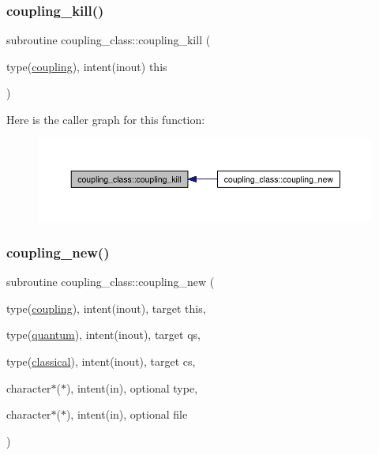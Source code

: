 \mbox{\label{namespacecoupling__class_a774339d5b87453601c0664a199df7823}} 
\subsubsection{\texorpdfstring{coupling\+\_\+kill()}{coupling\_kill()}}
{\footnotesize\ttfamily subroutine coupling\+\_\+class\+::coupling\+\_\+kill (\begin{DoxyParamCaption}\item[{type(\hyperlink{structcoupling__class_1_1coupling}{coupling}), intent(inout)}]{this }\end{DoxyParamCaption})\hspace{0.3cm}{\ttfamily [private]}}

Here is the caller graph for this function\+:\nopagebreak
\begin{figure}[H]
\begin{center}
\leavevmode
\includegraphics[width=350pt]{namespacecoupling__class_a774339d5b87453601c0664a199df7823_icgraph}
\end{center}
\end{figure}
\mbox{\label{namespacecoupling__class_a5fa07e475bf96111bc76820037fc26a4}} 
\subsubsection{\texorpdfstring{coupling\+\_\+new()}{coupling\_new()}}
{\footnotesize\ttfamily subroutine coupling\+\_\+class\+::coupling\+\_\+new (\begin{DoxyParamCaption}\item[{type(\hyperlink{structcoupling__class_1_1coupling}{coupling}), intent(inout), target}]{this,  }\item[{type(\hyperlink{structquantum__class_1_1quantum}{quantum}), intent(inout), target}]{qs,  }\item[{type(\hyperlink{structclassical__class_1_1classical}{classical}), intent(inout), target}]{cs,  }\item[{character$\ast$($\ast$), intent(in), optional}]{type,  }\item[{character$\ast$($\ast$), intent(in), optional}]{file }\end{DoxyParamCaption})\hspace{0.3cm}{\ttfamily [private]}}

